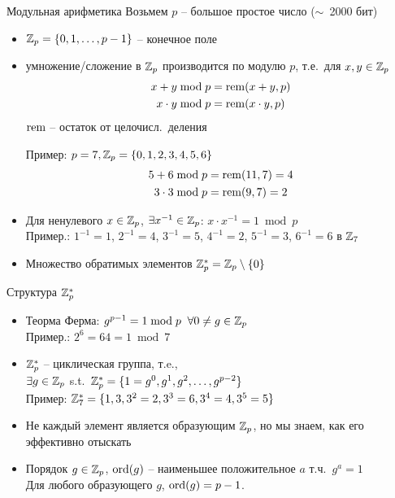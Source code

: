\documentclass[usenames,dvipsnames,8pt,aspectratio=169]{beamer}
\begin{document}
\begin{frame}{Модульная арифметика}
\Large 
{\color{Orange} Возьмем $p$ -- большое простое число ($\sim$\ 2000 бит)}
\begin{itemize}
	\item ${{\mathbb Z}}_p = \left\{ 0, 1, \ldots, p-1 \right\}$ -- конечное поле
	\item умножение/сложение в ${{\mathbb Z}}_p$ производится по модулю $p$, т.е.\ для $x, y \in {{\mathbb Z}}_p$
	\begin{align*}
	x+y \bmod p &= \mathrm{rem}(x+y, p) \\
	x\cdot y \bmod p &= \mathrm{rem}(x\cdot y, p)
	\end{align*}
	{\hspace{90pt} \large $\mathrm{rem} $ -- остаток от целочисл.\ деления}\\[10pt]
	\pause
	
	Пример: $p  = 7, {{\mathbb Z}}_p = \{0, 1, 2, 3, 4, 5, 6\}$
	\begin{align*}
	5+6 \bmod p &= \mathrm{rem}(11, 7) = 4 \\
	3\cdot 3  \bmod p &= \mathrm{rem}(9, 7) = 2
	\end{align*}
	\pause
	\item Для ненулевого $x \in {{\mathbb Z}}_p$, $\exists x^{-1} \in {{\mathbb Z}}_p$: $x \cdot x^{-1} = 1 \bmod p$\\
	Пример.:  $1^{-1} = 1$, $2^{-1} = 4$, $3^{-1} = 5$,  $4^{-1} = 2$, $5^{-1} = 3$, $6^{-1} = 6$ в ${{\mathbb Z}}_7$
	\item Множество обратимых элементов ${{\mathbb Z}}_p^{\ast} = {{\mathbb Z}}_p \setminus \{0\}$
\end{itemize}

\end{frame}

\begin{frame}{Структура ${{\mathbb Z}}_p^\ast$ }
\Large
\begin{itemize}
\itemsep 10pt
\item {\color{Orange} Теорма Ферма:} $g^{p-1} = 1 \bmod p \; \; \forall 0 \neq g \in {{\mathbb Z}}_p$\\[5pt]
Пример.: $2^6 = 64 = 1 \bmod 7$
\item ${{\mathbb Z}}_p^\ast$ --  {\color{Orange} циклическая группа}, т.e., \\
$\exists g \in {{\mathbb Z}}_p$ s.t.\ ${{\mathbb Z}}_p^\ast = \{1 = g^0, g^1, g^2, \ldots, g^{p-2}\}$ \\[5pt]
Пример: ${{\mathbb Z}}_7^\ast = \{1, 3, 3^2 = 2, 3^3 = 6, 3^4 = 4, 3^5 = 5\}$ 

\item Не каждый элемент является образующим  ${{\mathbb Z}}_p$, но мы знаем, как его эффективно отыскать

\item {\color{Orange} Порядок} $g \in {{\mathbb Z}}_p$, $\mathrm{ord}(g)$ -- {\color{Orange} наименьшее} положительное $a$ т.ч.\ $g^a = 1$ \\[5pt]
Для любого образующего $g$, $\mathrm{ord}(g) = p-1$.
\end{itemize}
\end{frame}
\end{document}
